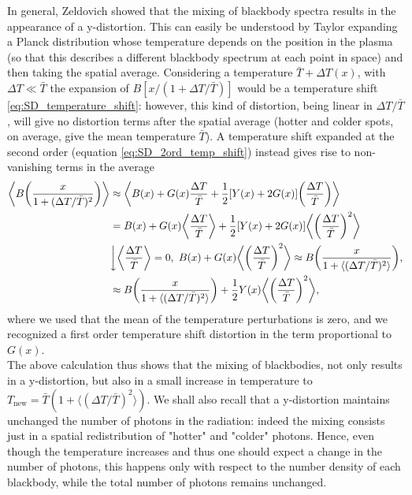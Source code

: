 In general, Zeldovich \cite{Zeldovich1972} showed that the mixing of blackbody spectra results in the appearance of a y-distortion. This can easily be understood by Taylor expanding a Planck distribution whose temperature depends on the position in the plasma (so that this describes a different blackbody spectrum at each point in space) and then taking the spatial average. Considering a temperature $\bar{T}+\Delta T(x)$, with $\Delta T\ll\bar{T}$ the expansion of $B[x/(1+\Delta T/\bar T)]$ would be a temperature shift \ref{eq:SD_temperature_shift}: however, this kind of distortion, being linear in $\Delta T/\bar T$, will give no distortion terms after the spatial average (hotter and colder spots, on average, give the mean temperature $\bar T$). A temperature shift expanded at the second order (equation \ref{eq:SD_2ord_temp_shift}) instead gives rise to non-vanishing terms in the average
\begin{align}
     \nonumber\bigg\langle B\bigg(\frac{x}{1+(\Delta T/\bar T)^2}\bigg)\bigg\rangle&\approx\bigg\langle B(x)+G(x)\frac{\Delta T}{\bar T}+\frac{1}{2}[Y(x)+2G(x)]\bigg(\frac{\Delta T}{\bar T}\bigg)\bigg\rangle\\\nonumber
     &=B(x)+G(x)\bigg\langle\frac{\Delta T}{\bar T}\bigg\rangle+\frac{1}{2}[Y(x)+2G(x)]\bigg\langle\bigg(\frac{\Delta T}{\bar T}\bigg)^2\bigg\rangle\\&\bigg\downarrow \bigg\langle\frac{\Delta T}{\bar T}\bigg\rangle=0,\ B(x)+G(x)\bigg\langle\bigg(\frac{\Delta T}{\bar T}\bigg)^2\bigg\rangle\approx B\bigg(\frac{x}{1+\langle(\Delta T/\bar T)^2\rangle}\bigg),\nonumber\\
     &\approx B\bigg(\frac{x}{1+\langle(\Delta T/\bar T)^2\rangle}\bigg)+\frac{1}{2}Y(x)\bigg\langle\bigg(\frac{\Delta T}{\bar T}\bigg)^2\bigg\rangle,\label{eq:Mixing_Y_SD}
\end{align}
where we used that the mean of the temperature perturbations is zero, and we recognized a first order temperature shift distortion in the term proportional to $G(x)$.\\ The above calculation thus shows that the mixing of blackbodies, not only results in a y-distortion, but also in a small increase in temperature to $T_{\text{new}}=\bar T(1+\langle(\Delta T/\bar T)^2\rangle)$. We shall also recall that a y-distortion maintains unchanged the number of photons in the radiation: indeed the mixing consists just in a spatial redistribution of "hotter" and "colder" photons. Hence, even though the temperature increases and thus one should expect a change in the number of photons, this happens only with respect to the number density of each blackbody, while the total number of photons remains unchanged.

